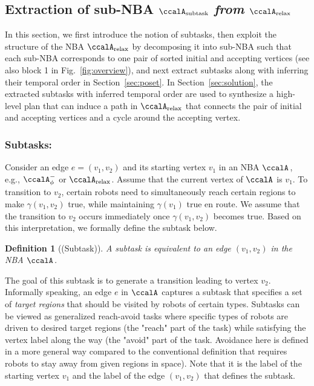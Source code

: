 \documentclass[Afour,sageh,times]{sagej}
\newtheorem{defn}[thm]{Definition}
\newcommand{\auto}[1]{\ccalA_{\textup{#1}}}
\newcommand{\autop}{\ccalA_{\phi}}
\begin{document}
{  \subsection{Extraction of sub-NBA \upshape  $\auto{subtask}$ {\it from} $\auto{relax}$}\label{sec:pregraph}
  In this section, we first introduce the notion of subtasks, then exploit the structure of the NBA $\auto{relax}$ by decomposing it into sub-NBA such that each sub-NBA corresponds to one pair of sorted initial and accepting vertices (see also block 1 in Fig.~\ref{fig:overview}), and next extract subtasks along with inferring their temporal order in  Section~\ref{sec:poset}. In Section~\ref{sec:solution}, the extracted subtasks with inferred temporal order are used to synthesize a high-level plan that can induce a path in $\auto{relax}$ that connects the pair of initial and accepting vertices and a cycle around the accepting vertex.
\subsubsection{Subtasks:}\label{sec:subtask}
Consider an edge $e = (v_1, v_2) $  and its starting vertex $v_1$ in an NBA $\auto{}$, e.g., $\autop^-$ or $\auto{relax}$.  Assume that the current vertex of $\auto{}$ is $v_1$. To transition to $v_2$, certain robots need to simultaneously reach certain regions to make $\gamma(v_1, v_2)$ true, while maintaining  $\gamma(v_1)$ true en route. We assume that the transition to $v_2$ occurs immediately once $\gamma(v_1, v_2)$ becomes true. Based on this interpretation, we formally define the subtask below.
\begin{defn}[(Subtask)]\label{defn:subtask}
 {A subtask is equivalent to an edge $(v_1, v_2)$ in the NBA $\auto{}$.}
\end{defn}

The goal of this subtask is to generate a transition leading to vertex $v_2$. Informally speaking, an edge $e$ in $\auto{}$ captures a subtask that specifies a set of \textit{target regions} that should be visited by robots of certain types. Subtasks can be viewed as generalized reach-avoid tasks where  specific types of robots are driven to desired target regions (the "reach" part of the task) while satisfying the vertex label along the way (the "avoid" part of the task. Avoidance here is defined in a more general way compared to the conventional definition that requires robots to stay away from given regions in space). Note that it is the label of the starting vertex $v_1$ and the label of the edge $(v_1, v_2)$ that defines the subtask.

}
\end{document}
